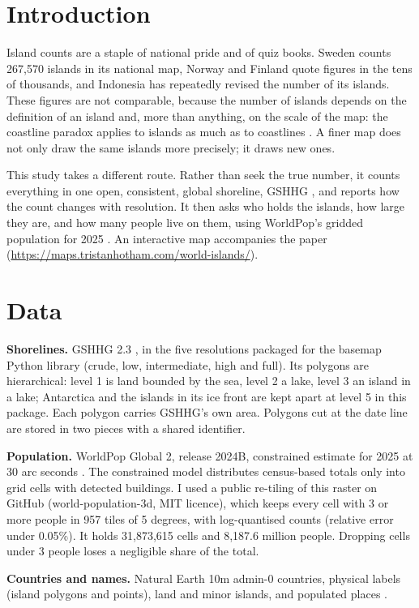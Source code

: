 \documentclass[11pt,a4paper]{article}
\begin{document}
\section{Introduction}
Island counts are a staple of national pride and of quiz books. Sweden counts 267,570 islands in its national map, Norway and Finland quote figures in the tens of thousands, and Indonesia has repeatedly revised the number of its islands. These figures are not comparable, because the number of islands depends on the definition of an island and, more than anything, on the scale of the map: the coastline paradox applies to islands as much as to coastlines \citep{mandelbrot}. A finer map does not only draw the same islands more precisely; it draws new ones.

This study takes a different route. Rather than seek the true number, it counts everything in one open, consistent, global shoreline, GSHHG \citep{gshhg}, and reports how the count changes with resolution. It then asks who holds the islands, how large they are, and how many people live on them, using WorldPop's gridded population for 2025 \citep{worldpop}. An interactive map accompanies the paper (\url{https://maps.tristanhotham.com/world-islands/}).

\section{Data}
\textbf{Shorelines.} GSHHG 2.3 \citep{gshhg}, in the five resolutions packaged for the basemap Python library (crude, low, intermediate, high and full). Its polygons are hierarchical: level 1 is land bounded by the sea, level 2 a lake, level 3 an island in a lake; Antarctica and the islands in its ice front are kept apart at level 5 in this package. Each polygon carries GSHHG's own area. Polygons cut at the date line are stored in two pieces with a shared identifier.

\textbf{Population.} WorldPop Global 2, release 2024B, constrained estimate for 2025 at 30 arc seconds \citep{worldpop}. The constrained model distributes census-based totals only into grid cells with detected buildings. I used a public re-tiling of this raster on GitHub (world-population-3d, MIT licence), which keeps every cell with 3 or more people in 957 tiles of 5 degrees, with log-quantised counts (relative error under 0.05\%). It holds 31,873,615 cells and 8,187.6 million people. Dropping cells under 3 people loses a negligible share of the total.

\textbf{Countries and names.} Natural Earth 10m admin-0 countries, physical labels (island polygons and points), land and minor islands, and populated places \citep{naturalearth}.
\end{document}
